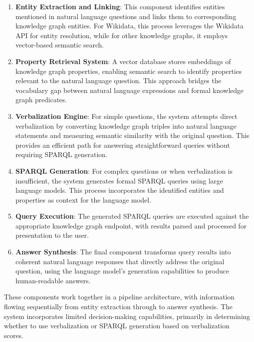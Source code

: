 \begin{enumerate}
    \item \textbf{Entity Extraction and Linking}: This component identifies entities mentioned in natural language questions and links them to corresponding knowledge graph entities. For Wikidata, this process leverages the Wikidata API for entity resolution, while for other knowledge graphs, it employs vector-based semantic search.
    
    \item \textbf{Property Retrieval System}: A vector database stores embeddings of knowledge graph properties, enabling semantic search to identify properties relevant to the natural language question. This approach bridges the vocabulary gap between natural language expressions and formal knowledge graph predicates.
    
    \item \textbf{Verbalization Engine}: For simple questions, the system attempts direct verbalization by converting knowledge graph triples into natural language statements and measuring semantic similarity with the original question. This provides an efficient path for answering straightforward queries without requiring SPARQL generation.
    
    \item \textbf{SPARQL Generation}: For complex questions or when verbalization is insufficient, the system generates formal SPARQL queries using large language models. This process incorporates the identified entities and properties as context for the language model.
    
    \item \textbf{Query Execution}: The generated SPARQL queries are executed against the appropriate knowledge graph endpoint, with results parsed and processed for presentation to the user.
    
    \item \textbf{Answer Synthesis}: The final component transforms query results into coherent natural language responses that directly address the original question, using the language model's generation capabilities to produce human-readable answers.
\end{enumerate}

These components work together in a pipeline architecture, with information flowing sequentially from entity extraction through to answer synthesis. The system incorporates limited decision-making capabilities, primarily in determining whether to use verbalization or SPARQL generation based on verbalization scores.

